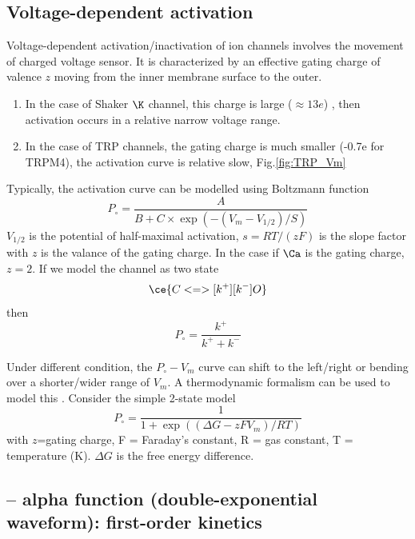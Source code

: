 \subsection{Voltage-dependent activation}

Voltage-dependent activation/inactivation of ion channels involves the movement
of charged voltage sensor. It is characterized by an effective gating charge of
valence $z$ moving from the inner membrane surface to the outer.
\begin{enumerate}
  \item  In the case of Shaker $\K$ channel, this charge is large ($\approx 13e$)
\citep{aggarwal1996css}, then activation occurs in a relative narrow voltage
range.
  \item In the case of TRP channels, the gating charge is much smaller (-0.7e
  for TRPM4), the activation curve is relative slow, Fig.\ref{fig:TRP_Vm}
\end{enumerate}

Typically, the activation curve can be modelled using Boltzmann function
\begin{equation}
P_\circ = \frac{A}{B + C\times \exp(-(V_m-V_{1/2})/S)}
\end{equation}
$V_{1/2}$ is the potential of half-maximal activation, $s=RT/(zF)$ is the slope
factor with $z$ is the valance of the gating charge. In the case if $\Ca$ is the
gating charge, $z=2$. If we model the channel as two state
\begin{equation}
\ce{ C <=>[k^+][k^-] O}
\end{equation}
then
\begin{equation}
P_\circ = \frac{k^+}{k^++k^-}
\end{equation}

Under different condition, the $P_\circ-V_m$ curve can shift to the
left/right or bending over a shorter/wider range of $V_m$. A thermodynamic
formalism can be used to model this \citep{voets2004}. Consider the simple
2-state model
\begin{equation}
P_\circ = \frac{1}{1 + \exp\left( (\Delta G - zFV_m)/RT \right)}
\end{equation}
with $z$=gating charge, F = Faraday's constant, R = gas constant, T =
temperature (K). $\Delta G$ is the free energy difference.

\subsection{-- alpha function (double-exponential waveform): first-order
kinetics}
\label{sec:alpha-function}

